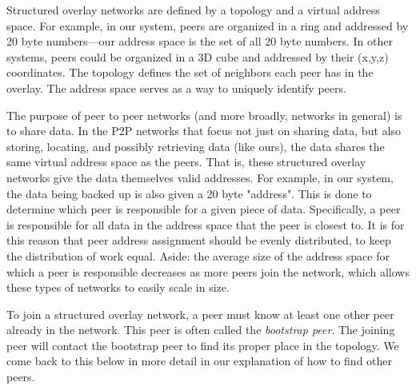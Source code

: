 \documentclass[12pt]{report}
\begin{document}
Structured overlay networks are defined by a topology and a virtual address space. For example, in our system, peers are organized in a ring and addressed by 20 byte numbers---our address space is the set of all 20 byte numbers. In other systems, peers could be organized in a 3D cube and addressed by their (x,y,z) coordinates. The topology defines the set of neighbors each peer has in the overlay. The address space serves as a way to uniquely identify peers.

The purpose of peer to peer networks (and more broadly, networks in general) is to share data. In the P2P networks that focus not just on sharing data, but also storing, locating, and possibly retrieving data (like ours), the data shares the same virtual address space as the peers. That is, these structured overlay networks give the data themselves valid addresses. For example, in our system, the data being backed up is also given a 20 byte "address". This is done to determine which peer is responsible for a given piece of data. Specifically, a peer is responsible for all data in the address space that the peer is closest to. It is for this reason that peer address assignment should be evenly distributed, to keep the distribution of work equal. Aside: the average size of the address space for which a peer is responsible decreases as more peers join the network, which allows these types of networks to easily scale in size.

To join a structured overlay network, a peer must know at least one other peer already in the network. This peer is often called the \textit{bootstrap peer}. The joining peer will contact the bootstrap peer to find its proper place in the topology. We come back to this below in more detail in our explanation of how to find other peers.
\end{document}
